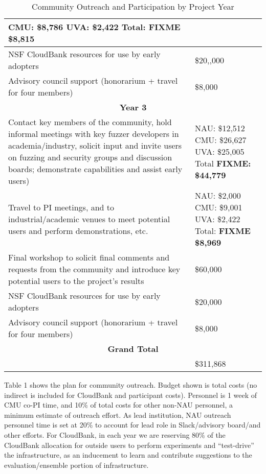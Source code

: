 \documentclass[12pt]{article}
\begin{document}
\begin{table}
\begin{tabular}{|p{12cm}|p{3cm}|}
                                                       CMU: \$8,786
                                                       UVA:  \$2,422
                                                       Total: \textbf{FIXME \$8,815}\\
    \hline
    NSF CloudBank resources for use by early adopters & \$20,,000 \\
    \hline 
    Advisory council support (honorarium + travel for four members) & \$8,000 \\    
    \hline
    \hline
    \multicolumn{2}{c}{{\bf Year 3}} \\
    \hline
    \hline
   Contact key members of the community, hold informal meetings with
    key fuzzer developers in academia/industry, solicit input and
    invite users
    on fuzzing and security groups and discussion boards; demonstrate
    capabilities and assist early users) &  NAU:   \$12,512 CMU: \$26,627 UVA: \$25,005
                                                      Total \textbf{FIXME:  \$44,779} \\
    \hline
    Travel to PI meetings, and to industrial/academic venues to meet
    potential users and perform demonstrations, etc. & NAU: \$2,000
                                                       CMU: \$9,001
                                                       UVA:  \$2,422
                                                       Total: \textbf{FIXME \$8,969}\\
    \hline    
    Final workshop to solicit final comments and requests from the
    community and introduce key potential users to the project’s
    results & \$60,000 \\
    \hline
    NSF CloudBank resources for use by early adopters & \$20,000 \\
    \hline 
    Advisory council support (honorarium + travel for four members) & \$8,000 \\    
    \hline
    \hline
    \multicolumn{2}{c}{{\bf Grand Total}} \\
    \hline
                   &     \$311,868 \\
                     \hline
 
  \end{tabular}
\label{outreach}
  \caption{Community Outreach and Participation by Project Year}
  
\end{table}


Table 1 shows the plan for community
outreach.   Budget shown is total costs 
 (no indirect is included for CloudBank and participant costs).   Personnel is 1 week of CMU co-PI time, and 10\%
of total costs for other non-NAU personnel, a
minimum estimate of outreach effort.  As lead institution, NAU
outreach personnel time is set at 20\% to account for lead role in
Slack/advisory board/and other efforts.  For CloudBank, in each year we
are reserving 80\% of the CloudBank allocation for outside users to
perform experiments and ``test-drive'' the infrastructure, as an
inducement to learn and contribute suggestions to the
evaluation/ensemble portion of infrastructure.
\end{document}
